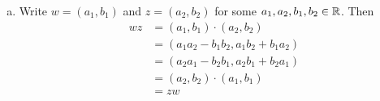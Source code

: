 \documentclass[11pt,fleqn,dvipsnames,usenames]{article}
\begin{document}
\begin{enumerate}
\begin{enumerate}[(a)]
\item Write $w = (a_{1},b_{1})$ and $z = (a_{2},b_{2})$ for some $a_{1},a_{2},b_{1},b_{2}\in\mathbb{R}$.  Then
\begin{align*}
wz &= (a_{1},b_{1})\cdot (a_{2},b_{2})\\
&= (a_{1}a_{2} - b_{1}b_{2},a_{1}b_{2} + b_{1}a_{2})\\
&= (a_{2}a_{1} - b_{2}b_{1},a_{2}b_{1} + b_{2}a_{1})\\
&= (a_{2},b_{2})\cdot (a_{1},b_{1})\\
&= zw
\end{align*}





\end{enumerate}
\end{enumerate}
\end{document}
